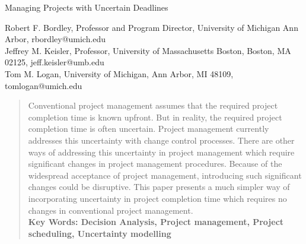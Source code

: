 \documentclass[11pt]{article}
\begin{document}
\begin{center} Managing Projects with Uncertain Deadlines
\end{center}
\begin{center}
Robert F. Bordley, Professor and Program Director, University of Michigan Ann Arbor, rbordley@umich.edu \\
Jeffrey M. Keisler, Professor, University of Massachusetts Boston, Boston, MA 02125, jeff.keisler@umb.edu \\
Tom M. Logan, University of Michigan, Ann Arbor, MI 48109, tomlogan@umich.edu
\end{center}
\begin{abstract}
Conventional project management assumes that the required project completion time is known upfront.  But in reality, the required project completion time is often uncertain.  Project management currently addresses this uncertainty with change control processes.  There are other ways of addressing this uncertainty in project management which require significant changes in project management procedures.  Because of the widespread acceptance of project management, introducing such significant changes could be disruptive. This paper presents a much simpler way of incorporating uncertainty in project completion time which requires no changes in conventional project management. \\
\bf Key Words: \rm Decision Analysis, Project management, Project scheduling, Uncertainty modelling
\end{abstract}
\end{document}
